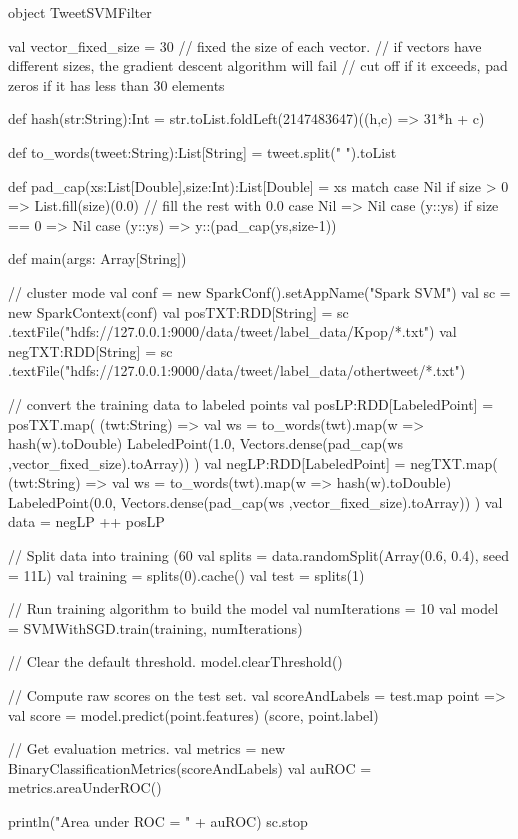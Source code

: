 \documentclass[10pt]{article}
\begin{document}
\begin{code}
object TweetSVMFilter {

  val vector_fixed_size = 30 
  // fixed the size of each vector. 
  // if vectors have different sizes, the gradient descent algorithm will fail
  // cut off if it exceeds, pad zeros if it has less than 30 elements

  def hash(str:String):Int = str.toList.foldLeft(2147483647)((h,c) => 31*h + c)
  
  def to_words(tweet:String):List[String] = tweet.split(" ").toList

  def pad_cap(xs:List[Double],size:Int):List[Double] = xs match 
  {
    case Nil if size > 0 => List.fill(size)(0.0) // fill the rest with 0.0
    case Nil             => Nil 
    case (y::ys) if size == 0 => Nil
    case (y::ys)              => y::(pad_cap(ys,size-1))
  }

  def main(args: Array[String]) {
     
    // cluster mode
    val conf = new SparkConf().setAppName("Spark SVM")
    val sc = new SparkContext(conf)
    val posTXT:RDD[String] = sc
      .textFile("hdfs://127.0.0.1:9000/data/tweet/label_data/Kpop/*.txt") 
    val negTXT:RDD[String] = sc
      .textFile("hdfs://127.0.0.1:9000/data/tweet/label_data/othertweet/*.txt") 
    
    // convert the training data to labeled points
    val posLP:RDD[LabeledPoint] = posTXT.map( (twt:String) => 
    {
      val ws = to_words(twt).map(w => hash(w).toDouble)
      LabeledPoint(1.0, Vectors.dense(pad_cap(ws ,vector_fixed_size).toArray))
    })
    val negLP:RDD[LabeledPoint] = negTXT.map( (twt:String) => 
    { 
      val ws = to_words(twt).map(w => hash(w).toDouble)
      LabeledPoint(0.0, Vectors.dense(pad_cap(ws ,vector_fixed_size).toArray))
    })
    val data = negLP ++ posLP

    // Split data into training (60%
    val splits = data.randomSplit(Array(0.6, 0.4), seed = 11L)
    val training = splits(0).cache()
    val test = splits(1)

    // Run training algorithm to build the model
    val numIterations = 10
    val model = SVMWithSGD.train(training, numIterations)

    // Clear the default threshold.
    model.clearThreshold()

    // Compute raw scores on the test set. 
    val scoreAndLabels = test.map { point =>
      val score = model.predict(point.features)
      (score, point.label)
    }

    // Get evaluation metrics.
    val metrics = new BinaryClassificationMetrics(scoreAndLabels)
    val auROC = metrics.areaUnderROC()

    println("Area under ROC = " + auROC)	
    sc.stop
  }
}
\end{code}
\end{document}
